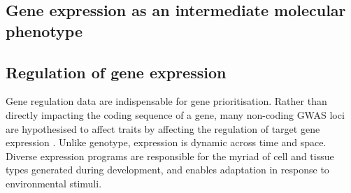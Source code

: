 \begin{outline}
%

\section{Gene expression as an intermediate molecular phenotype}

\subsection{Regulation of gene expression}


Gene regulation data are indispensable for gene prioritisation. 
Rather than directly impacting the coding sequence of a gene, 
many non-coding \gls{GWAS} loci are hypothesised to affect traits by affecting the regulation of target gene expression \autocite{gallagher2018PostGWASEraAssociation,cano-gamez2020GWASFunctionUsing}.
Unlike genotype, expression is dynamic across time and space.
Diverse expression programs are responsible for the myriad of cell and tissue types generated during development,
and enables adaptation in response to environmental stimuli.


\end{outline}
